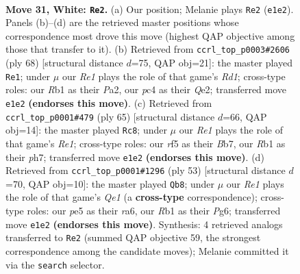 \documentclass[11pt]{article}
\begin{document}
\clearpage

\begin{figure}[p]\centering
\begin{subfigure}{0.46\textwidth}\centering
\resizebox{\linewidth}{!}{%
\newchessgame
\chessboard[
  setfen={r1bq2k1/8/8/4pr1p/2p4P/p1P3P1/P1QB4/1R2R1K1 w - - 4 31},
  showmover=false,
  pgfstyle=straightmove, color=movearrow, markmove={e1-e2}
]}
\caption{}
\end{subfigure}\hfill
\begin{subfigure}{0.46\textwidth}\centering
\resizebox{\linewidth}{!}{%
\newchessgame
\chessboard[
  setfen={8/5k1p/p1pq3B/3r1bP1/1P1P1p2/8/P3QP2/3R2K1 w - - 1 35},
  showmover=false,
  pgfstyle=straightmove, color=movearrow, markmove={d1-e1}
]}
\caption{}
\end{subfigure}
\\[4pt]
\begin{subfigure}{0.46\textwidth}\centering
\resizebox{\linewidth}{!}{%
\newchessgame
\chessboard[
  setfen={4r2k/1bQ4P/4rp1R/1p1q2p1/p2P4/B1P2P2/6P1/R5K1 b - - 2 33},
  showmover=false,
  pgfstyle=straightmove, color=movearrow, markmove={e8-c8}
]}
\caption{}
\end{subfigure}\hfill
\begin{subfigure}{0.46\textwidth}\centering
\resizebox{\linewidth}{!}{%
\newchessgame
\chessboard[
  setfen={4q1k1/3b1p2/R5p1/1r1Pp2p/4P2P/2Q2PP1/1r4B1/3R2K1 b - - 0 27},
  showmover=false,
  pgfstyle=straightmove, color=movearrow, markmove={e8-b8}
]}
\caption{}
\end{subfigure}
\caption{\textbf{Move 31, White: \texttt{Re2}.} (a) Our position; Melanie plays \texttt{Re2} (\texttt{e1e2}). Panels (b)--(d) are the retrieved master positions whose correspondence most drove this move (highest QAP objective among those that transfer to it). (b) Retrieved from \texttt{ccrl\_top\_p0003\#2606} (ply 68) [structural distance $d$=75, QAP obj=21]: the master played \texttt{Re1}; under $\mu$ our \emph{Re1} plays the role of that game's \emph{Rd1}; cross-type roles: our \emph{R}b1 as their \emph{P}a2, our \emph{p}c4 as their \emph{Q}e2; transferred move \texttt{e1e2} \textbf{(endorses this move)}. (c) Retrieved from \texttt{ccrl\_top\_p0001\#479} (ply 65) [structural distance $d$=66, QAP obj=14]: the master played \texttt{Rc8}; under $\mu$ our \emph{Re1} plays the role of that game's \emph{Re1}; cross-type roles: our \emph{r}f5 as their \emph{B}b7, our \emph{R}b1 as their \emph{p}h7; transferred move \texttt{e1e2} \textbf{(endorses this move)}. (d) Retrieved from \texttt{ccrl\_top\_p0001\#1296} (ply 53) [structural distance $d$=70, QAP obj=10]: the master played \texttt{Qb8}; under $\mu$ our \emph{Re1} plays the role of that game's \emph{Qe1} (a \textbf{cross-type} correspondence); cross-type roles: our \emph{p}e5 as their \emph{r}a6, our \emph{R}b1 as their \emph{P}g6; transferred move \texttt{e1e2} \textbf{(endorses this move)}. Synthesis: 4 retrieved analogs transferred to \texttt{Re2} (summed QAP objective 59, the strongest correspondence among the candidate moves); Melanie committed it via the \texttt{search} selector.}
\label{fig:thought-m60}
\end{figure}
\end{document}
